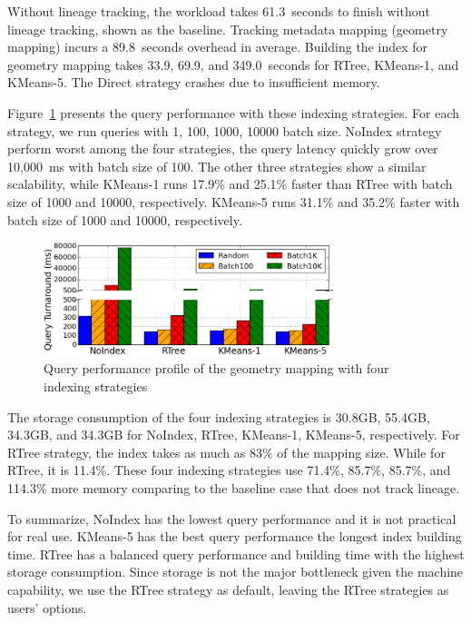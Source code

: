 \documentclass{sig-alternate}
\begin{document}
Without lineage tracking, the workload takes 61.3~seconds to finish without lineage tracking, shown as the baseline.
Tracking metadata mapping (geometry mapping) incurs a 89.8~seconds overhead in average. 
Building the index for geometry mapping takes 33.9, 69.9, and 349.0~seconds for RTree, KMeans-1, and KMeans-5.
The Direct strategy crashes due to insufficient memory.

Figure~\ref{fig:sift-query} presents the query performance with these indexing strategies.
For each strategy, we run queries with {1, 100, 1000, 10000} batch size.
NoIndex strategy perform worst among the four strategies, the query latency quickly grow over 10,000~ms with batch size of 100.
The other three strategies show a similar scalability, while KMeans-1 runs 17.9\% and 25.1\% faster than RTree with batch size of 1000 and 10000, respectively.
KMeans-5 runs  31.1\% and 35.2\% faster with batch size of 1000 and 10000, respectively.


\begin{figure}[h]
\begin{center}
    \includegraphics[width=85mm]{pictures/SIFTQuery-Time}
\caption {Query performance profile of the geometry mapping with four indexing strategies
    \label{fig:sift-query}
}
\end{center}
\end{figure}

The storage consumption of the four indexing strategies is 30.8GB, 55.4GB, 34.3GB, and 34.3GB 
for NoIndex, RTree, KMeans-1, KMeans-5, respectively. 
For RTree strategy, the index takes as much as 83\% of the mapping size. 
While for RTree, it is 11.4\%.
These four indexing strategies use 71.4\%, 85.7\%, 85.7\%, and 114.3\% more memory comparing to the
baseline case that does not track lineage.

To summarize, NoIndex has the lowest query performance and it is not practical for real use.
KMeans-5 has the best query performance the longest index building time.
RTree has a balanced query performance and building time with the highest storage consumption.
Since storage is not the major bottleneck given the machine capability, we use the RTree strategy
as default, leaving the RTree strategies as users' options.
\end{document}
